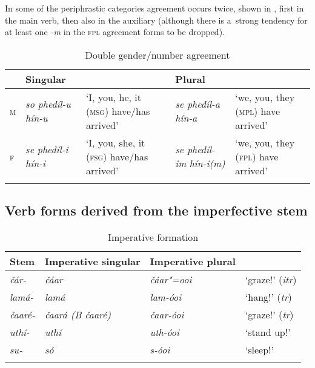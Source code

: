 In some of the periphrastic categories agreement occurs twice, shown in , first in the main verb, then also in the auxiliary (although there is a~strong tendency for at least one \textit{-m} in the \textsc{fpl} agreement forms to be dropped).


\begin{table}[p]
\caption{Double gender/number agreement}

\begin{tabularx}{\textwidth}{ l P{20mm} Q P{20mm} Q }
\lsptoprule
&
Singular &
&
Plural &
\\\midrule
\textsc{m} &
\textit{so phedíl-u hín-u} &
`I, you, he, it (\textsc{msg}) have/has arrived' &
\textit{se phedíl-a hín-a} &
`we, you, they (\textsc{mpl}) have arrived'\\
\textsc{f} &
\textit{se phedíl-i hín-i} &
`I, you, she, it (\textsc{fsg}) have/has arrived' &
\textit{se phedíl-im}
\textit{hín-i(m)} &
`we, you, they (\textsc{fpl}) have arrived'\\\lspbottomrule
\end{tabularx}
\label{tab:8-21}
\end{table}


\subsection{Verb forms derived from the imperfective stem}
\label{subsec:8-4-2}



\begin{table}[p]
\caption{Imperative formation}
\begin{tabularx}{\textwidth}{ Q l@{\hspace{20pt}} l@{\hspace{20pt}} Q }
\lsptoprule
Stem &
Imperative singular &
Imperative plural &
\\\midrule
\textit{čár-} &
\textit{čáar} &
\textit{čáar"=ooi} &
`graze!' (\textit{itr})\\
\textit{lamá-} &
\textit{lamá} &
\textit{lam-óoi} &
`hang!' (\textit{tr})\\
\textit{čaaré-} &
\textit{čaará (B čaaré)} &
\textit{čaar-óoi} &
`graze!' (\textit{tr})\\
\textit{uthí-} &
\textit{uthí} &
\textit{uth-óoi} &
`stand up!'\\
\textit{su-} &
\textit{só} &
\textit{s-óoi} &
`sleep!'\\\lspbottomrule
\end{tabularx}
\label{tab:8-22}
\end{table}



